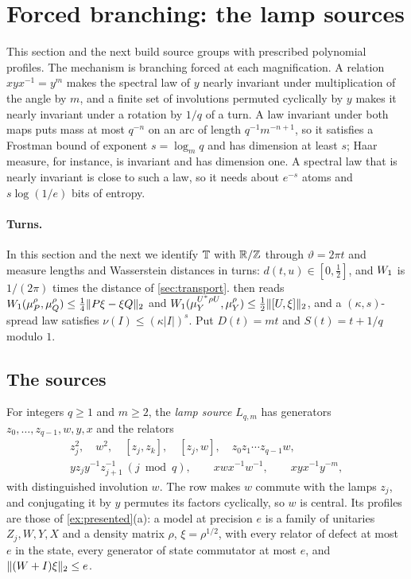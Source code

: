 \section{Forced branching: the lamp sources}\label{sec:rates}

This section and the next build source groups with prescribed polynomial profiles. The mechanism is branching forced
at each magnification. A relation $xyx^{-1}=y^m$ makes the spectral law of $y$ nearly invariant under multiplication of the
angle by $m$, and a finite set of involutions permuted cyclically by $y$ makes it nearly invariant under a rotation by
$1/q$ of a turn. A law invariant under both maps puts mass at most $q^{-n}$ on an arc of length $q^{-1}m^{-n+1}$, so it satisfies
a Frostman bound of exponent $s=\log_mq$ and has dimension at least $s$; Haar measure, for instance, is invariant and has dimension
one. A spectral law that is nearly invariant is close to such a law, so it needs about $e^{-s}$ atoms and $s\log(1/e)$ bits of
entropy.

\paragraph{Turns.} In this section and the next we identify $\mathbb T$ with $\mathbb R/\mathbb Z$ through $\vartheta=2\pi t$ and measure
lengths and Wasserstein distances in turns: $d(t,u)\in[0,\frac12]$, and $W_1$ is $1/(2\pi)$ times the distance of
\cref{sec:transport}.  then reads $W_1(\mu^\rho_P,\mu^\rho_Q)\le\frac14\lVert P\xi-\xi Q\rVert_2$ and
$W_1(\mu^{U^*\rho U}_Y,\mu^\rho_Y)\le\frac12\lVert [U,\xi]\rVert_2$, and a $(\kappa,s)$-spread law satisfies $\nu(I)\le(\kappa|I|)^s$. Put
$D(t)=mt$ and $S(t)=t+1/q$ modulo $1$.

\subsection{The sources}\label{sec:rates-sources}

\begin{definition}\label{def:lamps-source}
For integers $q\ge1$ and $m\ge2$, the \emph{lamp source} $L_{q,m}$ has generators $z_0,\dots,z_{q-1},w,y,x$ and the relators
\begin{gather*}
z_j^2,\quad w^2,\quad[z_j,z_k],\quad[z_j,w],\quad z_0z_1\cdots z_{q-1}w,\\
yz_jy^{-1}z_{j+1}^{-1}\ (j\bmod q),\qquad xwx^{-1}w^{-1},\qquad xyx^{-1}y^{-m},
\end{gather*}
with distinguished involution $w$. The row makes $w$ commute with the lamps $z_j$, and conjugating it by $y$ permutes its
factors cyclically, so $w$ is central. Its profiles are those of \cref{ex:presented}(a): a model at precision $e$ is a
family of unitaries $Z_j,W,Y,X$ and a density matrix $\rho$, $\xi=\rho^{1/2}$, with every relator of defect at most $e$ in
the state, every generator of state commutator at most $e$, and $\lVert (W+I)\xi\rVert_2\le e$.
\end{definition}

